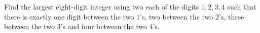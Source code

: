 Find the largest eight-digit integer using two each of the digits $1,2,3,4$ such that there is exactly one digit between the two $1$'s, two between the two $2$'s, three between the two $3$'s and four between the two $4$'s.
